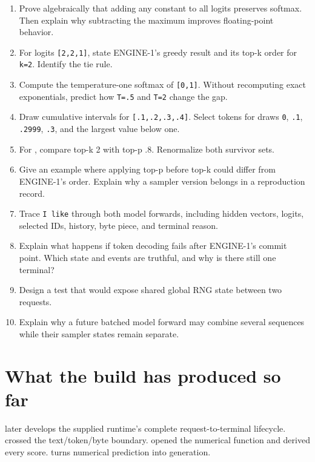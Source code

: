 \begin{enumerate}
\def\labelenumi{\arabic{enumi}.}
\tightlist
\item
  Prove algebraically that adding any constant to all logits preserves
  softmax. Then explain why subtracting the maximum improves
  floating-point behavior.
\item
  For logits \texttt{{[}2,2,1{]}}, state ENGINE-1's greedy result and
  its top-k order for \texttt{k=2}. Identify the tie rule.
\item
  Compute the temperature-one softmax of \texttt{{[}0,1{]}}. Without
  recomputing exact exponentials, predict how \texttt{T=.5} and
  \texttt{T=2} change the gap.
\item
  Draw cumulative intervals for \texttt{{[}.1,.2,.3,.4{]}}. Select
  tokens for draws \texttt{0}, \texttt{.1}, \texttt{.2999}, \texttt{.3},
  and the largest value below one.
\item
  For \texttt{\seqsplit{[.40,.30,.15,.10,.05]}}, compare top-k 2 with
  top-p .8. Renormalize both survivor sets.
\item
  Give an example where applying top-p before top-k could differ from
  ENGINE-1's order. Explain why a sampler version belongs in a
  reproduction record.
\item
  Trace \texttt{I\ like} through both model forwards, including hidden
  vectors, logits, selected IDs, history, byte piece, and terminal
  reason.
\item
  Explain what happens if token decoding fails after ENGINE-1's commit
  point. Which state and events are truthful, and why is there still one
  terminal?
\item
  Design a test that would expose shared global RNG state between two
  requests.
\item
  Explain why a future batched model forward may combine several
  sequences while their sampler states remain separate.
\end{enumerate}

\section{What the build has produced so far}\label{what-part-i-has-built}

 later develops the supplied runtime's complete
request-to-terminal lifecycle.
 crossed the text/token/byte boundary.  opened the
numerical function and derived every score.  turns numerical
prediction into generation.

